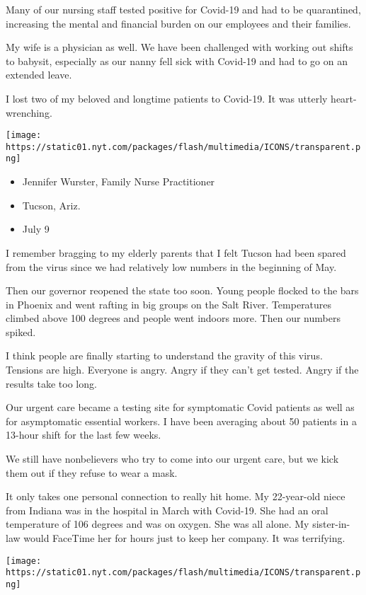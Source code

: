 Many of our nursing staff tested positive for Covid-19 and had to be
quarantined, increasing the mental and financial burden on our employees
and their families.

My wife is a physician as well. We have been challenged with working out
shifts to babysit, especially as our nanny fell sick with Covid-19 and
had to go on an extended leave.

I lost two of my beloved and longtime patients to Covid-19. It was
utterly heart-wrenching.

\texttt{[image: https://static01.nyt.com/packages/flash/multimedia/ICONS/transparent.png]}

\begin{itemize}
\tightlist
\item
  Jennifer Wurster, Family Nurse Practitioner
\item
  Tucson, Ariz.
\item
  July 9
\end{itemize}

I remember bragging to my elderly parents that I felt Tucson had been
spared from the virus since we had relatively low numbers in the
beginning of May.

Then our governor reopened the state too soon. Young people flocked to
the bars in Phoenix and went rafting in big groups on the Salt River.
Temperatures climbed above 100 degrees and people went indoors more.
Then our numbers spiked.

I think people are finally starting to understand the gravity of this
virus. Tensions are high. Everyone is angry. Angry if they can't get
tested. Angry if the results take too long.

Our urgent care became a testing site for symptomatic Covid patients as
well as for asymptomatic essential workers. I have been averaging about
50 patients in a 13-hour shift for the last few weeks.

We still have nonbelievers who try to come into our urgent care, but we
kick them out if they refuse to wear a mask.

It only takes one personal connection to really hit home. My 22-year-old
niece from Indiana was in the hospital in March with Covid-19. She had
an oral temperature of 106 degrees and was on oxygen. She was all alone.
My sister-in-law would FaceTime her for hours just to keep her company.
It was terrifying.

\texttt{[image: https://static01.nyt.com/packages/flash/multimedia/ICONS/transparent.png]}

